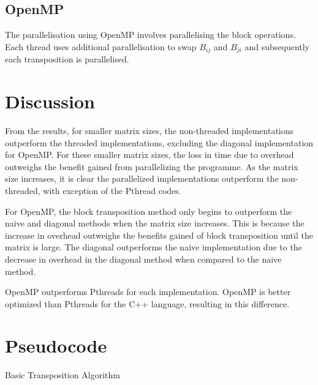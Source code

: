 \documentclass[a4paper,10pt]{article}
\begin{document}
\subsection{OpenMP}
The parallelisation using OpenMP involves parallelising the block operations. Each thread uses additional parallelisation to swap $B_{ij}$ and $B_{ji}$ and subsequently each transposition is parallelised. 

\section{Discussion}

From the results, for smaller matrix sizes, the non-threaded implementations outperform the threaded implementations, excluding the diagonal implementation for OpenMP.
For these smaller matrix sizes, the loss in time due to overhead outweighs the benefit gained from parallelizing the programme.
As the matrix size increases, it is clear the parallelized implementations outperform the non-threaded, with exception of the Pthread codes.

For OpenMP, the block transposition method only begins to outperform the naive and diagonal methods when the matrix size increases.
This is because the increase in overhead outweighs the benefits gained of block transposition until the matrix is large.
The diagonal outperforms the naive implementation due to the decrease in overhead in the diagonal method when compared to the naive method. 

OpenMP outperforms Pthreads for each implementation.
OpenMP is better optimized than Pthreads for the C++ language, resulting in this difference.

\section{Pseudocode}


\begin{algorithm}[H]
	\SetAlgoLined
\caption{Basic Transposition Algorithm}
\end{algorithm}
\end{document}
